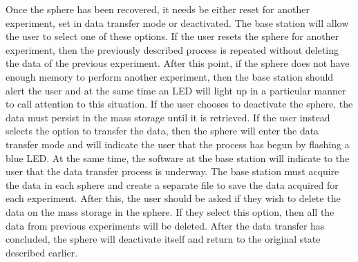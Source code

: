 Once the sphere has been recovered, it needs be either reset for another experiment, set in data transfer mode or deactivated.  The base station will allow the user to select one of these options.  If the user resets the sphere for another experiment, then the previously described process is repeated without deleting the data of the previous experiment.  After this point, if the sphere does not have enough memory to perform another experiment, then the base station should alert the user and at the same time an LED will light up in a particular manner to call attention to this situation. If the user chooses to deactivate the sphere, the data must persist in the mass storage until it is retrieved. If the user instead selects the option to transfer the data, then the sphere will enter the data transfer mode and will indicate the user that the process has begun by flashing a blue LED.  At the same time, the software at the base station will indicate to the user that the data transfer process is underway.  The base station must acquire the data in each sphere and create a separate file to save the data acquired for each experiment.  After this, the user should be asked if they wish to delete the data on the mass storage in the sphere.  If they select this option, then all the data from previous experiments will be deleted.  After the data transfer has concluded, the sphere will deactivate itself and return to the original state described earlier.





